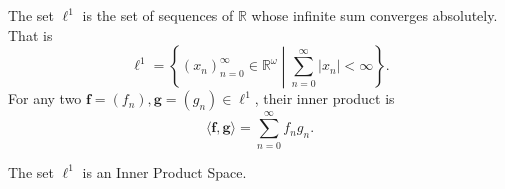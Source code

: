 \begin{definition}[$\ell^1$]
    The set $\ell^{1}$ is the set of sequences of $\mathbb{R}$ whose infinite sum converges absolutely.
    That is
    \begin{equation*}
        \ell^{1} = \left\{ (x_n)_{n=0}^{\infty} \in \mathbb{R}^{\omega} \middle| \sum_{n=0}^{\infty} \lvert x_n \rvert < \infty \right\}.
    \end{equation*}
    For any two $\mathbf{f} = (f_n), \mathbf{g} = (g_n) \in \ell^{1}$, their inner product is
    \begin{equation*}
        \langle \mathbf{f}, \mathbf{g} \rangle = \sum\limits_{n=0}^{\infty} f_ng_n.
    \end{equation*}
\end{definition}
\begin{proposition}
    The set $\ell^{1}$ is an Inner Product Space.
\end{proposition}

